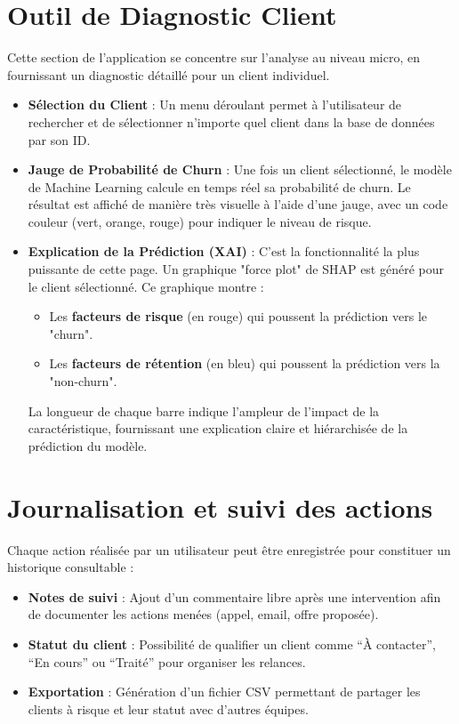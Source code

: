 \section{Outil de Diagnostic Client}
Cette section de l'application se concentre sur l'analyse au niveau micro, en fournissant un diagnostic détaillé pour un client individuel.
\begin{itemize}
    \item \textbf{Sélection du Client} : Un menu déroulant permet à l'utilisateur de rechercher et de sélectionner n'importe quel client dans la base de données par son ID.
    \item \textbf{Jauge de Probabilité de Churn} : Une fois un client sélectionné, le modèle de Machine Learning calcule en temps réel sa probabilité de churn. Le résultat est affiché de manière très visuelle à l'aide d'une jauge, avec un code couleur (vert, orange, rouge) pour indiquer le niveau de risque.
    \item \textbf{Explication de la Prédiction (XAI)} : C'est la fonctionnalité la plus puissante de cette page. Un graphique "force plot" de SHAP est généré pour le client sélectionné. Ce graphique montre :
    \begin{itemize}
        \item Les \textbf{facteurs de risque} (en rouge) qui poussent la prédiction vers le "churn".
        \item Les \textbf{facteurs de rétention} (en bleu) qui poussent la prédiction vers la "non-churn".
    \end{itemize}
    La longueur de chaque barre indique l'ampleur de l'impact de la caractéristique, fournissant une explication claire et hiérarchisée de la prédiction du modèle.
\end{itemize}

\section{Journalisation et suivi des actions}
Chaque action réalisée par un utilisateur peut être enregistrée pour constituer un historique consultable :
\begin{itemize}
    \item \textbf{Notes de suivi} : Ajout d'un commentaire libre après une intervention afin de documenter les actions menées (appel, email, offre proposée).
    \item \textbf{Statut du client} : Possibilité de qualifier un client comme ``À contacter'', ``En cours'' ou ``Traité'' pour organiser les relances.
    \item \textbf{Exportation} : Génération d'un fichier CSV permettant de partager les clients à risque et leur statut avec d'autres équipes.
\end{itemize}

